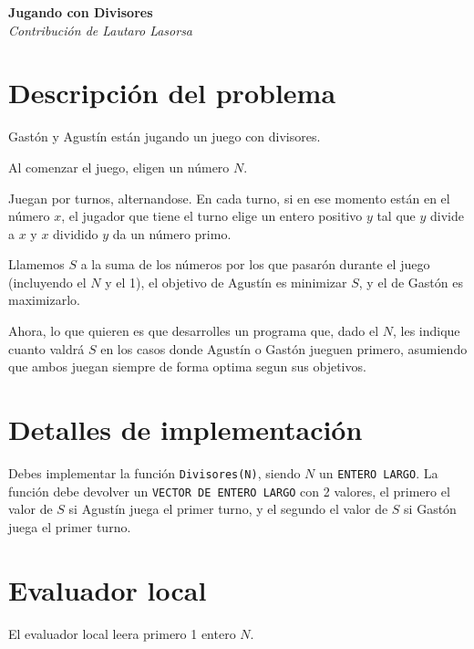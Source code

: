 \documentclass[fontsize=13pt, paper=a4, DIV=calc]{scrartcl}
\renewcommand*{\maketitle}{
	\begin{center}
		\textbf{\nombre}\\
		\textit{\footnotesize Contribución de \author}
	\end{center}
}
\begin{document}
\def\contest{OIA Certamen Nacional Nivel 1}
\def\nombre{Jugando con Divisores}
\def\author{Lautaro Lasorsa}
\def\niveldia{}
\def\numero{}
\def\archivo{divisores}%
\def\version{}


\maketitle
\begin{multicols*}{2}

\section{Descripción del problema}

Gastón y Agustín están jugando un juego con divisores.

Al comenzar el juego, eligen un número $N$. 

Juegan por turnos, alternandose. En cada turno, si en ese momento están en el número $x$, el jugador que tiene el turno elige un entero positivo $y$ tal que $y$ divide a $x$ y $x$ dividido $y$ da un número primo.

Llamemos $S$ a la suma de los números por los que pasarón durante el juego (incluyendo el $N$ y el 1), el objetivo de Agustín es minimizar $S$, y el de Gastón es maximizarlo.

Ahora, lo que quieren es que desarrolles un programa que, dado el $N$, les indique cuanto valdrá $S$ en los casos donde Agustín o Gastón jueguen primero, asumiendo que ambos juegan siempre de forma optima segun sus objetivos.

\section{Detalles de implementación}
Debes implementar la función \texttt{Divisores(N)}, siendo $N$ un \texttt{ENTERO LARGO}. La función debe devolver un \texttt{VECTOR DE ENTERO LARGO} con 2 valores, el primero el valor de $S$ si Agustín juega el primer turno, y el segundo el valor de $S$ si Gastón juega el primer turno.

\section{Evaluador local}
El evaluador local leera primero 1 entero $N$.


\end{multicols*}
\end{document}
